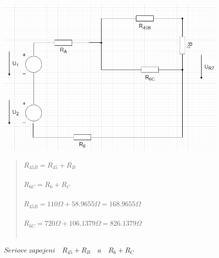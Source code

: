 \begin{figure}[H]
    \centering
    \includegraphics[scale=0.5]{picturesFor1Uloha/3.png}
    \caption{$Seriove \: zapojeni \quad R_{45} + R_B \quad a \quad R_6 + R_C $ }
    \label{fig:Serial_resistor_R45B_and_R6C}
    \begin{quote}
    \centering
    $R_{45B} = R_{45} + R_B $  \\~\\
    $R_{6C} = R_6 + R_C $  \\~\\
    $R_{45B} = 110\Omega + 58.9655\Omega = 168.9655\Omega$ \\~\\
    $R_{6C} =720\Omega + 106.1379\Omega = 826.1379\Omega$ \\~\\
    \end{quote}
\end{figure}

